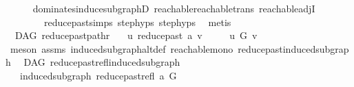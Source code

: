 \begin{isabellebody}
\ \ \ \ \isamarkupfalse%
\ dominates{\isacharunderscore}{\kern0pt}induce{\isacharunderscore}{\kern0pt}subgraphD\ reachable{}{\isacharunderscore}{\kern0pt}reachable{\isacharunderscore}{\kern0pt}trans\ reachable{\isacharunderscore}{\kern0pt}adjI\ \isanewline
\ \ \ \ \ \ \ \ reduce{\isacharunderscore}{\kern0pt}past{\isachardot}{\kern0pt}simps\ step{\isachardot}{\kern0pt}hyps{\isacharparenleft}{\kern0pt}{}{\isacharparenright}{\kern0pt}\ step{\isachardot}{\kern0pt}hyps{\isacharparenleft}{\kern0pt}{}{\isacharparenright}{\kern0pt}\ \isamarkupfalse%
\ metis\isanewline
\ \ \ \ \ \isanewline
{}\isamarkupfalse%
%
\endisatagproof
{\isafoldproof}%
%
\isadelimproof
\isanewline
%
\endisadelimproof
\isanewline
\isanewline
{}\isamarkupfalse%
\ {\isacharparenleft}{\kern0pt}\ DAG{\isacharparenright}{\kern0pt}\ reduce{\isacharunderscore}{\kern0pt}past{\isacharunderscore}{\kern0pt}pathr{\isacharcolon}{\kern0pt}\isanewline
\ \ \ {\isachardoublequoteopen}u\ {\isasymrightarrow}\isactrlsup {\isacharasterisk}{\kern0pt}\isactrlbsub reduce{\isacharunderscore}{\kern0pt}past\ a\isactrlesub \ v{\isachardoublequoteclose}\ \isanewline
\ \ \ {\isachardoublequoteopen}\ u\ {\isasymrightarrow}\isactrlsup {\isacharasterisk}{\kern0pt}\isactrlbsub G\isactrlesub \ v{\isachardoublequoteclose}\isanewline
%
\isadelimproof
\ \ %
\endisadelimproof
%
\isatagproof
{}\isamarkupfalse%
\ {\isacharparenleft}{\kern0pt}meson\ assms\ induced{\isacharunderscore}{\kern0pt}subgraph{\isacharunderscore}{\kern0pt}altdef\ reachable{\isacharunderscore}{\kern0pt}mono\ reduce{\isacharunderscore}{\kern0pt}past{\isacharunderscore}{\kern0pt}induced{\isacharunderscore}{\kern0pt}subgraph{\isacharparenright}{\kern0pt}%
\endisatagproof
{\isafoldproof}%
%
\isadelimproof
%
\endisadelimproof
%
\isadelimdocument
%
\endisadelimdocument
%
\isatagdocument
%
\isamarkuptrue%
%
\endisatagdocument
{\isafolddocument}%
%
\isadelimdocument
%
\endisadelimdocument
{}\isamarkupfalse%
\ {\isacharparenleft}{\kern0pt}\ DAG{\isacharparenright}{\kern0pt}\ reduce{\isacharunderscore}{\kern0pt}past{\isacharunderscore}{\kern0pt}refl{\isacharunderscore}{\kern0pt}induced{\isacharunderscore}{\kern0pt}subgraph{\isacharcolon}{\kern0pt}\isanewline
\ \ \ {\isachardoublequoteopen}induced{\isacharunderscore}{\kern0pt}subgraph\ {\isacharparenleft}{\kern0pt}reduce{\isacharunderscore}{\kern0pt}past{\isacharunderscore}{\kern0pt}refl\ a{\isacharparenright}{\kern0pt}\ G{\isachardoublequoteclose}\isanewline

\end{isabellebody}

